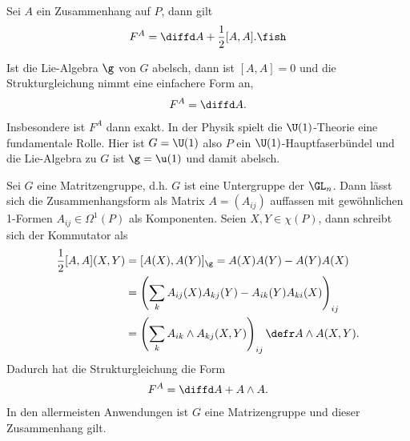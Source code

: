 \documentclass[%
	paper=a5,%
	fleqn,%
	DIV=18,%
	BCOR=0mm,
	fontsize=11pt,
	titlepage=false,%
	bibliography=totoc,
	DIV=18,%
	twoside=true,
	pdftitle=Riemannsche Geometrie,
	pdfauthor=Uwe Semmelmann,
	numbers=noendperiod]%
	{scrbook}
\begin{document}
\begin{prop}[Strukturgleichung]
Sei $A$ ein Zusammenhang auf $P$, dann gilt
\begin{align*}
F^A = \diffd A + \frac{1}{2}[A,A].\fish
\end{align*}
\end{prop}

\begin{rem}[Bemerkungen.]
\begin{remenum}
\item Ist die Lie-Algebra $\g$ von $G$ abelsch, dann ist $[A,A] = 0$ und die
Strukturgleichung nimmt eine einfachere Form an,
\begin{align*}
F^A = \diffd A.
\end{align*}
Insbesondere ist $F^A$ dann exakt. In der Physik spielt die $\U(1)$-Theorie eine
fundamentale Rolle. Hier ist $G=\U(1)$ also $P$ ein $\U(1)$-Hauptfaserbündel
und die Lie-Algebra zu $G$ ist $\g = \u(1)$ und damit abelsch.
\item Sei $G$ eine Matritzengruppe, d.h. $G$ ist eine Untergruppe der $\GL_n$.
Dann lässt sich die Zusammenhangsform als Matrix $A=(A_{ij})$ auffassen mit
gewöhnlichen 1-Formen $A_{ij}\in\Omega^1(P)$ als Komponenten. Seien
$X,Y\in\chi(P)$, dann schreibt sich der Kommutator als
\begin{align*}
\frac{1}{2}[A,A](X,Y) &= 
[A(X),A(Y)]_\g = A(X)A(Y)-A(Y)A(X)\\
&= \left( \sum_k A_{ij}(X)A_{kj}(Y) - A_{ik}(Y)A_{ki}(X) \right)_{ij}\\
&= \left( \sum_k A_{ik}\wedge A_{kj}(X,Y) \right)_{ij} \defr A\wedge A(X,Y).
\end{align*}
Dadurch hat die Strukturgleichung die Form
\begin{align*}
F^A = \diffd A + A\wedge A.
\end{align*}
In den allermeisten Anwendungen ist $G$ eine Matrizengruppe und dieser
Zusammenhang gilt.\map
\end{remenum}
\end{rem}
\end{document}
